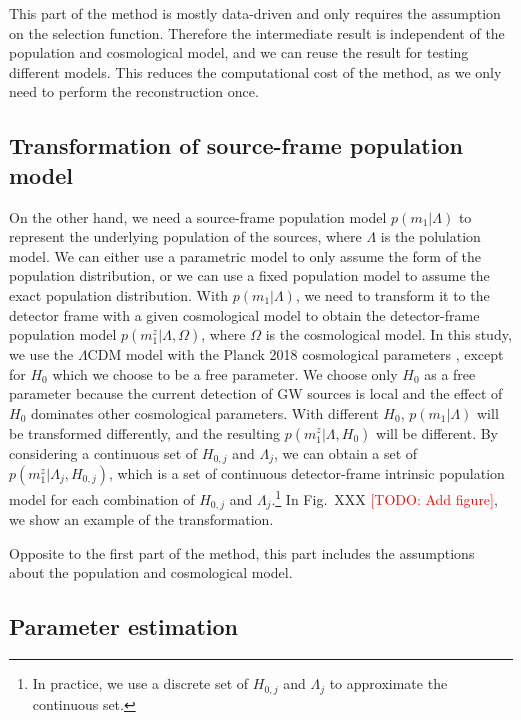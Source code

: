 \documentclass[aps,prd,twocolumn,superscriptaddress,preprintnumbers,nofootinbib,hidelinks]{revtex4-2}
\newcommand{\todo}[1]{\textcolor{red}{[TODO: #1]}}
\begin{document}
This part of the method is mostly data-driven and only requires the assumption on the selection function.
Therefore the intermediate result is independent of the population and cosmological model, and we can reuse the result for testing different models.
This reduces the computational cost of the method, as we only need to perform the reconstruction once.

\subsection{Transformation of source-frame population model}
\label{sec:transformation}

On the other hand, we need a source-frame population model $p(m_1|\Lambda)$ to represent the underlying population of the sources, where $\Lambda$ is the polulation model.
We can either use a parametric model to only assume the form of the population distribution, or we can use a fixed population model to assume the exact population distribution.
With $p(m_1|\Lambda)$, we need to transform it to the detector frame with a given cosmological model to obtain the detector-frame population model $p(m^z_1|\Lambda, \Omega)$, where $\Omega$ is the cosmological model.
In this study, we use the $\Lambda$CDM model with the Planck 2018 cosmological parameters \citep{Planck:2018vyg}, except for $H_0$ which we choose to be a free parameter.
We choose only $H_0$ as a free parameter because the current detection of \ac{GW} sources is local and the effect of $H_0$ dominates other cosmological parameters.
With different $H_0$, $p(m_1|\Lambda)$ will be transformed differently, and the resulting $p(m^z_1|\Lambda, H_0)$ will be different.
By considering a continuous set of $H_{0,j}$ and $\Lambda_j$, we can obtain a set of $p(m^z_1|\Lambda_j, H_{0,j})$, which is a set of continuous detector-frame intrinsic population model for each combination of $H_{0,j}$ and $\Lambda_j$.\footnote{In practice, we use a discrete set of $H_{0,j}$ and $\Lambda_j$ to approximate the continuous set.}
In Fig.~XXX \todo{Add figure}, we show an example of the transformation.

Opposite to the first part of the method, this part includes the assumptions about the population and cosmological model.

\subsection{Parameter estimation}
\label{sec:pe}
\end{document}
